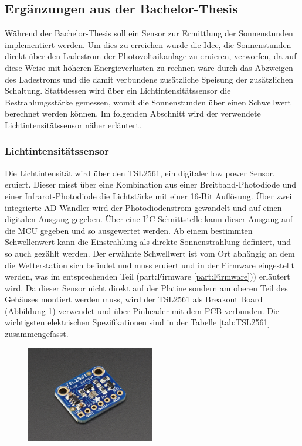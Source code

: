 \subsection{Ergänzungen aus der Bachelor-Thesis}
Während der Bachelor-Thesis soll ein Sensor zur Ermittlung der Sonnenstunden implementiert werden. Um dies zu erreichen wurde die Idee, die Sonnenstunden direkt über den Ladestrom der Photovoltaikanlage zu eruieren, verworfen, da auf diese Weise mit höheren Energieverlusten zu rechnen wäre durch das Abzweigen des Ladestroms und die damit verbundene zusätzliche Speisung der zusätzlichen Schaltung. Stattdessen wird über ein Lichtintensitätssensor die Bestrahlungsstärke gemessen, womit die Sonnenstunden über einen Schwellwert berechnet werden können. Im folgenden Abschnitt wird der verwendete Lichtintensitätssensor näher erläutert.

\subsubsection{Lichtintensitätssensor}
Die Lichtintensität wird über den TSL2561, ein digitaler low power Sensor, eruiert. Dieser misst über eine Kombination aus einer Breitband-Photodiode und einer Infrarot-Photodiode die Lichtstärke mit einer 16-Bit Auflösung. Über zwei integrierte AD-Wandler wird der Photodiodenstrom gewandelt und auf einen digitalen Ausgang gegeben. Über eine I$^{2}$C Schnittstelle kann dieser Ausgang auf die MCU gegeben und so ausgewertet werden. Ab einem bestimmten Schwellenwert kann die Einstrahlung als direkte Sonnenstrahlung definiert, und so auch gezählt werden. Der erwähnte Schwellwert ist vom Ort abhängig an dem die Wetterstation sich befindet und muss eruiert und in der Firmware eingestellt werden, was im entsprechenden Teil (\refname{part:Firmware} \ref{part:Firmware})) erläutert wird. Da dieser Sensor nicht direkt auf der Platine sondern am oberen Teil des Gehäuses montiert werden muss, wird der TSL2561 als Breakout Board (Abbildung \ref{fig:TSL}) verwendet und über Pinheader mit dem PCB verbunden. Die wichtigsten elektrischen Spezifikationen sind in der Tabelle \ref{tab:TSL2561} zusammengefasst. \cite{TSL2561}\\

\begin{figure}[hbtp]
\centering
\includegraphics[width=0.5\textwidth]{graphics/TSL2561/TSL2561_Breakout.JPG}
\label{fig:TSL}
\end{figure}

